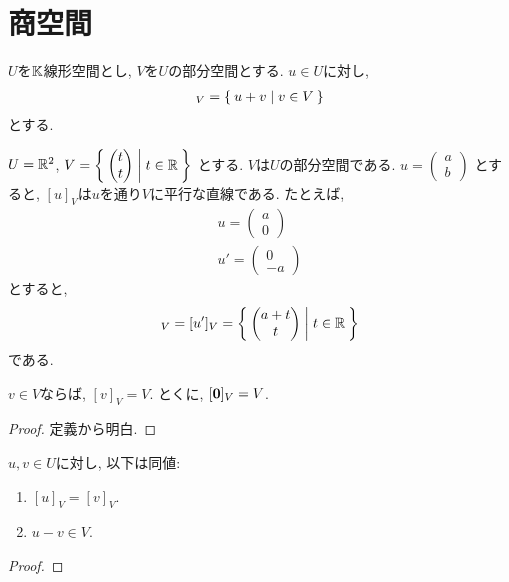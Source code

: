 \section{商空間}
$U$を$\mathbb{K}$線形空間とし,
$V$を$U$の部分空間とする.
$u\in U$に対し,
\begin{align*}
  [u]_V=\Set{u+v|v\in V}
\end{align*}
とする.
\begin{example}
$U=\mathbb{R}^2$, $V=\Set{\begin{pmatrix}t\\t\end{pmatrix}|t\in\mathbb{R}}$
  とする. $V$は$U$の部分空間である.
  $u=\begin{pmatrix}a\\b\end{pmatrix}$
  とすると,
  $[u]_V$は$u$を通り$V$に平行な直線である.
  たとえば,
  \begin{align*}
    u=\begin{pmatrix}a\\0\end{pmatrix}\\
    u'=\begin{pmatrix}0\\-a\end{pmatrix}
  \end{align*}
  とすると,
  \begin{align*}
    [u]_V=[u']_V=\Set{\begin{pmatrix}a+t\\t\end{pmatrix}|t\in\RR}
  \end{align*}
  である.
  \begin{figure}\caption{}\end{figure}
\end{example}
\begin{lemma}
$v\in V$ならば, $[v]_V=V$.
とくに,  $[\boldsymbol{0}]_V=V$.
\end{lemma}
\begin{proof}
定義から明白.
\end{proof}
\begin{lemma}
$u,v\in U$に対し, 以下は同値:
\begin{enumerate}
\item $[u]_V=[v]_V$.
\item $u-v \in V$.
\end{enumerate}
\end{lemma}
\begin{proof}\end{proof}

